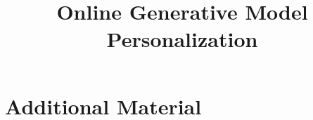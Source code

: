 \documentclass[acmtog, anonymous]{acmart}
\begin{document}
\title{Online Generative Model Personalization}

% 


\maketitle




\newpage




\clearpage


\clearpage
\section{Additional Material}

\end{document}
